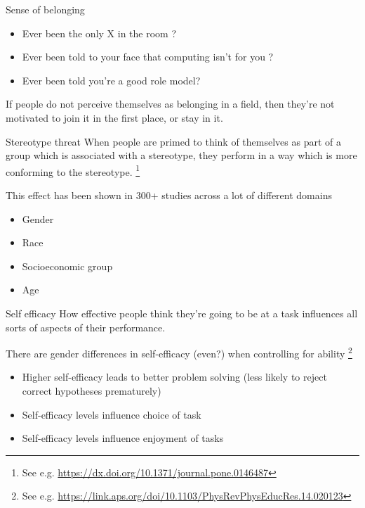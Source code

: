\documentclass[xcolor=table,aspectratio=169]{beamer}
\begin{document}
\begin{frame}{Sense of belonging }
	\begin{itemize}
		\item Ever been the only X in the room ?
			\pause
		\item Ever been told to your face that computing isn't for you ?
			\pause
		\item Ever been told you're a good role model?
	\end{itemize}
If people do not perceive themselves as belonging in a field, then they're not motivated to join it in the first place, or stay in it. 

\end{frame}

\begin{frame}{Stereotype threat}
	When people are primed to think of themselves as part of a group which is associated with a stereotype, they perform in a way which is more conforming to the stereotype. \footnote{See e.g. \url{https://dx.doi.org/10.1371/journal.pone.0146487}}

	\vspace{0.5em}
	This effect has been shown in 300+ studies across a lot of different domains
	\begin{itemize}
		\item Gender
		\item Race
		\item Socioeconomic group
		\item Age
	\end{itemize}
\end{frame}
\begin{frame}{Self efficacy}
How effective people think they're going to be at a task influences all sorts of aspects of their performance.

	\vspace{0.5em}

There are gender differences in self-efficacy (even?) when controlling for ability \footnote{See e.g. \url{https://link.aps.org/doi/10.1103/PhysRevPhysEducRes.14.020123}}
	\begin{itemize}
		\item Higher self-efficacy leads to better problem solving (less likely to reject correct hypotheses prematurely)
		\item Self-efficacy levels influence choice of task
		\item Self-efficacy levels influence enjoyment of tasks
	\end{itemize}
\end{frame}
\end{document}
